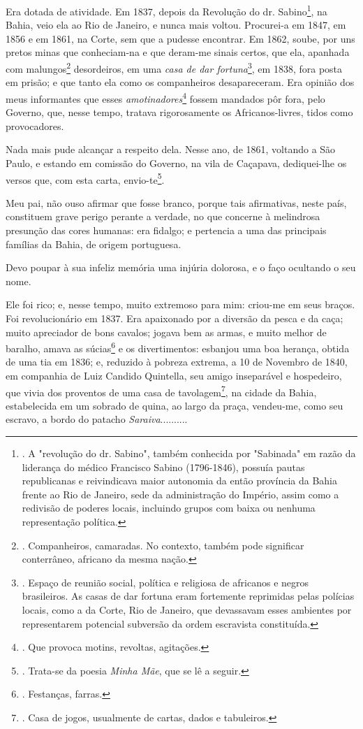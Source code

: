 Era dotada de atividade. Em 1837, depois da Revolução do dr.
Sabino\footnote{. A "revolução do dr. Sabino", também conhecida por
  "Sabinada" em razão da liderança do médico Francisco Sabino
  (1796-1846), possuía pautas republicanas e reivindicava maior
  autonomia da então província da Bahia frente ao Rio de Janeiro, sede
  da administração do Império, assim como a redivisão de poderes locais,
  incluindo grupos com baixa ou nenhuma representação política.}, na
Bahia, veio ela ao Rio de Janeiro, e nunca mais voltou. Procurei-a em
1847, em 1856 e em 1861, na Corte, sem que a pudesse encontrar. Em 1862,
soube, por uns pretos minas que conheciam-na e que deram-me sinais
certos, que ela, apanhada com malungos\footnote{. Companheiros,
  camaradas. No contexto, também pode significar conterrâneo, africano
  da mesma nação.} desordeiros, em uma \emph{casa de dar
fortuna}\footnote{. Espaço de reunião social, política e religiosa de
  africanos e negros brasileiros. As casas de dar fortuna eram
  fortemente reprimidas pelas polícias locais, como a da Corte, Rio de
  Janeiro, que devassavam esses ambientes por representarem potencial
  subversão da ordem escravista constituída.}, em 1838, fora posta em
prisão; e que tanto ela como os companheiros desapareceram. Era opinião
dos meus informantes que esses \emph{amotinadores}\footnote{. Que
  provoca motins, revoltas, agitações.} fossem mandados pôr fora, pelo
Governo, que, nesse tempo, tratava rigorosamente os Africanos-livres,
tidos como provocadores.

Nada mais pude alcançar a respeito dela. Nesse ano, de 1861, voltando a
São Paulo, e estando em comissão do Governo, na vila de Caçapava,
dediquei-lhe os versos que, com esta carta, envio-te\footnote{. Trata-se
  da poesia \emph{Minha Mãe}, que se lê a seguir.}.

Meu pai, não ouso afirmar que fosse branco, porque tais afirmativas,
neste país, constituem grave perigo perante a verdade, no que concerne à
melindrosa presunção das cores humanas: era fidalgo; e pertencia a uma
das principais famílias da Bahia, de origem portuguesa.

Devo poupar à sua infeliz memória uma injúria dolorosa, e o faço
ocultando o seu nome.

Ele foi rico; e, nesse tempo, muito extremoso para mim: criou-me em seus
braços. Foi revolucionário em 1837. Era apaixonado por a diversão da
pesca e da caça; muito apreciador de bons cavalos; jogava bem as armas,
e muito melhor de baralho, amava as súcias\footnote{. Festanças, farras.}
e os divertimentos: esbanjou uma boa herança, obtida de uma tia em 1836;
e, reduzido à pobreza extrema, a 10 de Novembro de 1840, em companhia de
Luiz Candido Quintella, seu amigo inseparável e hospedeiro, que vivia
dos proventos de uma casa de tavolagem\footnote{. Casa de jogos,
  usualmente de cartas, dados e tabuleiros.}, na cidade da Bahia,
estabelecida em um sobrado de quina, ao largo da praça, vendeu-me, como
seu escravo, a bordo do patacho \emph{Saraiva}..........

